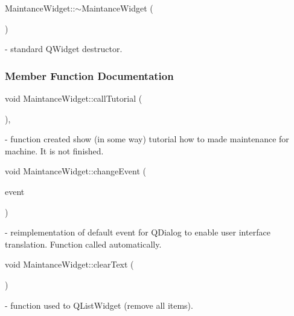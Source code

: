 \mbox{\label{classMaintanceWidget_ad824060037187de4a61a24ce2e393ca0}} 
{\footnotesize\ttfamily Maintance\+Widget\+::\texorpdfstring{$\sim$\+Maintance\+Widget}{~MaintanceWidget} (\begin{DoxyParamCaption}{ }\end{DoxyParamCaption})} - standard Q\+Widget destructor.

\subsubsection{Member Function Documentation}
\mbox{\label{classMaintanceWidget_adc20de8af45f910289c60d1f6656e783}} 
{\footnotesize\ttfamily void Maintance\+Widget\+::\texorpdfstring{call\+Tutorial}{callTutorial} (\begin{DoxyParamCaption}{ }\end{DoxyParamCaption})\hspace{0.3cm}{\ttfamily [private]}, {\ttfamily [slot]}} - function created show (in some way) tutorial how to made maintenance for machine. It is not finished.

\mbox{\label{classMaintanceWidget_ac88ccb3da3c15f85575eb5d973004827}} 
{\footnotesize\ttfamily void Maintance\+Widget\+::\texorpdfstring{change\+Event}{\texorpdfstring{change\+Event}{changeEvent}} (\begin{DoxyParamCaption}\item[{Q\+Event $\ast$}]{event }\end{DoxyParamCaption})\hspace{0.3cm}{\ttfamily [protected]}} - reimplementation of default event for Q\+Dialog to enable user interface translation. Function called automatically.

\mbox{\label{classMaintanceWidget_a46dbe90c80f405b594f2998a10a548db}} 
{\footnotesize\ttfamily void Maintance\+Widget\+::\texorpdfstring{clear\+Text}{clearText} (\begin{DoxyParamCaption}{ }\end{DoxyParamCaption})} - function used to  Q\+List\+Widget (remove all items).

